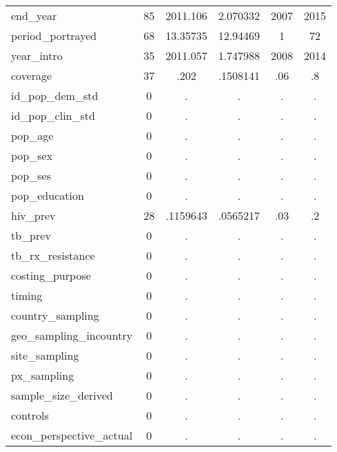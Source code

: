 \begin{table}[htbp]
\begin{tabular}{l*{1}{ccccc}}
end\_year    &          85&    2011.106&    2.070332&        2007&        2015\\
period\_portrayed&          68&    13.35735&    12.94469&           1&          72\\
year\_intro  &          35&    2011.057&    1.747988&        2008&        2014\\
coverage    &          37&        .202&    .1508141&         .06&          .8\\
id\_pop\_dem\_std&           0&           .&           .&           .&           .\\
id\_pop\_clin\_std&           0&           .&           .&           .&           .\\
pop\_age     &           0&           .&           .&           .&           .\\
pop\_sex     &           0&           .&           .&           .&           .\\
pop\_ses     &           0&           .&           .&           .&           .\\
pop\_education&           0&           .&           .&           .&           .\\
hiv\_prev    &          28&    .1159643&    .0565217&         .03&          .2\\
tb\_prev     &           0&           .&           .&           .&           .\\
tb\_rx\_resistance&           0&           .&           .&           .&           .\\
costing\_purpose&           0&           .&           .&           .&           .\\
timing      &           0&           .&           .&           .&           .\\
country\_sampling&           0&           .&           .&           .&           .\\
geo\_sampling\_incountry&           0&           .&           .&           .&           .\\
site\_sampling&           0&           .&           .&           .&           .\\
px\_sampling &           0&           .&           .&           .&           .\\
sample\_size\_derived&           0&           .&           .&           .&           .\\
controls    &           0&           .&           .&           .&           .\\
econ\_perspective\_actual&           0&           .&           .&           .&           .\\

\end{tabular}
\end{table}
